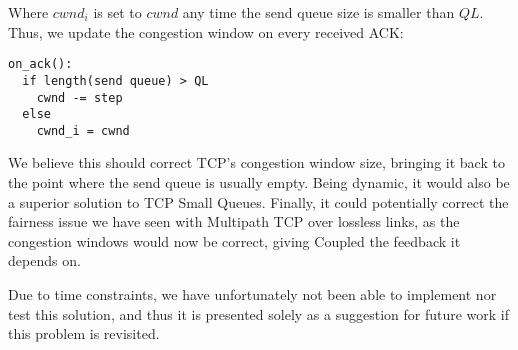 Where $cwnd_i$ is set to $cwnd$ any time the send queue size is smaller than $QL$.
Thus, we update the congestion window on every received ACK:

\begin{verbatim}
on_ack():
  if length(send queue) > QL
    cwnd -= step
  else
    cwnd_i = cwnd
\end{verbatim}

We believe this should correct TCP's congestion window size, bringing it back to
the point where the send queue is usually empty. Being dynamic, it would also be
a superior solution to TCP Small Queues. Finally, it could potentially correct the fairness
issue we have seen with Multipath TCP over lossless links, as the congestion
windows would now be correct, giving Coupled the feedback it depends on.

Due to time constraints, we have unfortunately not been able to implement nor test this
solution, and thus it is presented solely as a suggestion for future work if
this problem is revisited.
